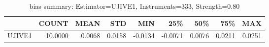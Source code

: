 \begin{table}[ht]
\centering
\caption{bias summary: Estimator=UJIVE1, Instruments=333, Strength=0.80}
\begin{tabular}{lrrrrrrrr}
\toprule
 & COUNT & MEAN & STD & MIN & 25\% & 50\% & 75\% & MAX \\
\midrule
UJIVE1 & 10.0000 & 0.0068 & 0.0158 & -0.0134 & -0.0071 & 0.0076 & 0.0211 & 0.0251 \\
\bottomrule
\end{tabular}
\end{table}
